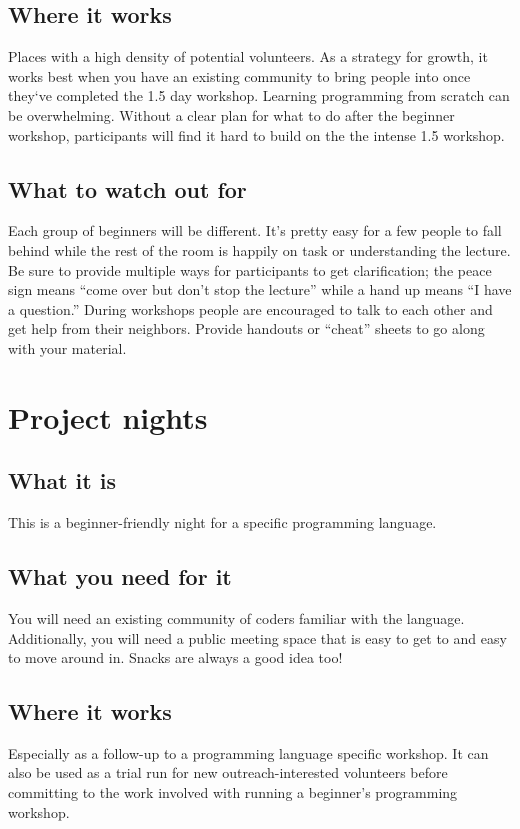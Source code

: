 \subsection{Where it works}
Places with a high density of potential volunteers. As a strategy for growth, it works best when you have an existing community to bring people into once they‘ve completed the 1.5 day workshop. Learning programming from scratch can be overwhelming. Without a clear plan for what to do after the beginner workshop, participants will find it hard to build on the the intense 1.5 workshop.

\subsection{What to watch out for}
Each group of beginners will be different. It’s pretty easy for a few people to fall behind while the rest of the room is happily on task or understanding the lecture. Be sure to provide multiple ways for participants to get clarification; the peace sign means “come over but don’t stop the lecture” while a hand up means “I have a question.” During workshops people are encouraged to talk to each other and get help from their neighbors. Provide handouts or “cheat” sheets to go along with your material. 

\section{Project nights}
\subsection{What it is}
This is a beginner-friendly night for a specific programming language. 

\subsection{What you need for it}
You will need an existing community of coders familiar with the language. Additionally, you will need a public meeting space that is easy to get to and easy to move around in. Snacks are always a good idea too!

\subsection{Where it works}
Especially as a follow-up to a programming language specific workshop. It can also be used as a trial run for new outreach-interested volunteers before committing to the work involved with running a beginner’s programming workshop.

